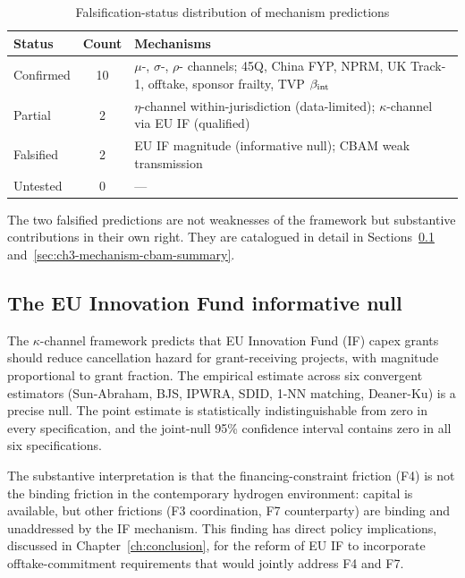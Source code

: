 \begin{table}[!htbp]
\centering
\caption{Falsification-status distribution of mechanism predictions}
\label{tab:ch3-mechanism-summary}
\begin{tabular}{lcl}
\toprule
Status & Count & Mechanisms \\
\midrule
Confirmed & 10 & $\mu$-, $\sigma$-, $\rho$- channels; 45Q, China FYP, NPRM, UK Track-1, offtake, sponsor frailty, TVP $\beta_{\mathrm{int}}$ \\
Partial & 2 & $\eta$-channel within-jurisdiction (data-limited); $\kappa$-channel via EU IF (qualified) \\
Falsified & 2 & EU IF magnitude (informative null); CBAM weak transmission \\
Untested & 0 & --- \\
\bottomrule
\end{tabular}
\end{table}

The two falsified predictions are not weaknesses of the framework but substantive contributions in their own right. They are catalogued in detail in Sections~\ref{sec:ch3-mechanism-eu-if-summary} and~\ref{sec:ch3-mechanism-cbam-summary}.

\subsection{The EU Innovation Fund informative null}
\label{sec:ch3-mechanism-eu-if-summary}

The $\kappa$-channel framework predicts that EU Innovation Fund (IF) capex grants should reduce cancellation hazard for grant-receiving projects, with magnitude proportional to grant fraction. The empirical estimate across six convergent estimators (Sun-Abraham, BJS, IPWRA, SDID, 1-NN matching, Deaner-Ku) is a precise null. The point estimate is statistically indistinguishable from zero in every specification, and the joint-null 95\% confidence interval contains zero in all six specifications.

The substantive interpretation is that the financing-constraint friction (F4) is not the binding friction in the contemporary hydrogen environment: capital is available, but other frictions (F3 coordination, F7 counterparty) are binding and unaddressed by the IF mechanism. This finding has direct policy implications, discussed in Chapter~\ref{ch:conclusion}, for the reform of EU IF to incorporate offtake-commitment requirements that would jointly address F4 and F7.


